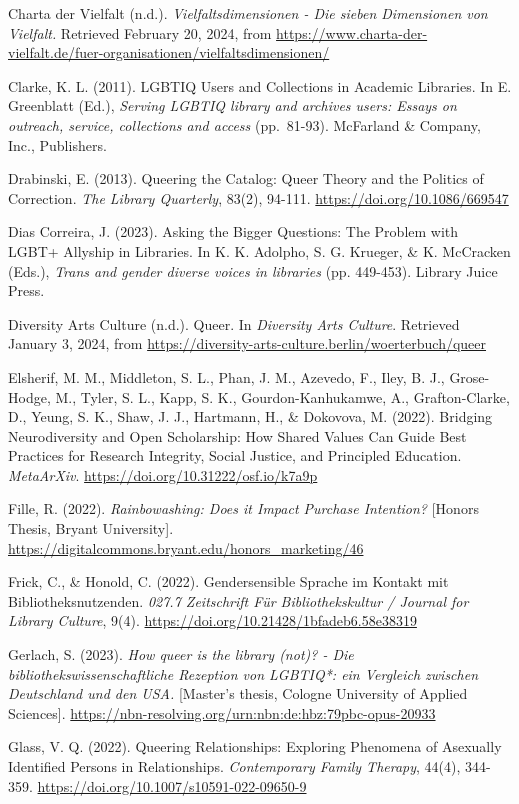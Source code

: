 \documentclass[a4paper,
fontsize=11pt,
oneside,
numbers=noperiodatend,
parskip=half-,
bibliography=totoc,
final
]{scrartcl}
\begin{document}
Charta der Vielfalt (n.d.). \emph{Vielfaltsdimensionen - Die sieben
Dimensionen von Vielfalt.} Retrieved February 20, 2024, from
\url{https://www.charta-der-vielfalt.de/fuer-organisationen/vielfaltsdimensionen/}

Clarke, K. L. (2011). LGBTIQ Users and Collections in Academic
Libraries. In E. Greenblatt (Ed.), \emph{Serving LGBTIQ library and
archives users: Essays on outreach, service, collections and access}
(pp.~81-93). McFarland \& Company, Inc., Publishers.

Drabinski, E. (2013). Queering the Catalog: Queer Theory and the
Politics of Correction. \emph{The Library Quarterly}, 83(2), 94-111.
\url{https://doi.org/10.1086/669547}

Dias Correira, J. (2023). Asking the Bigger Questions: The Problem with
LGBT+ Allyship in Libraries. In K. K. Adolpho, S. G. Krueger, \& K.
McCracken (Eds.), \emph{Trans and gender diverse voices in libraries}
(pp. 449-453). Library Juice Press.

Diversity Arts Culture (n.d.). Queer. In \emph{Diversity Arts Culture}.
Retrieved January 3, 2024, from
\url{https://diversity-arts-culture.berlin/woerterbuch/queer}

Elsherif, M. M., Middleton, S. L., Phan, J. M., Azevedo, F., Iley, B.
J., Grose-Hodge, M., Tyler, S. L., Kapp, S. K., Gourdon-Kanhukamwe, A.,
Grafton-Clarke, D., Yeung, S. K., Shaw, J. J., Hartmann, H., \&
Dokovova, M. (2022). Bridging Neurodiversity and Open Scholarship: How
Shared Values Can Guide Best Practices for Research Integrity, Social
Justice, and Principled Education. \emph{MetaArXiv}.
\url{https://doi.org/10.31222/osf.io/k7a9p}

Fille, R. (2022). \emph{Rainbowashing: Does it Impact Purchase
Intention?} {[}Honors Thesis, Bryant University{]}.
\url{https://digitalcommons.bryant.edu/honors_marketing/46}

Frick, C., \& Honold, C. (2022). Gendersensible Sprache im Kontakt mit
Bibliotheksnutzenden. \emph{027.7 Zeitschrift Für Bibliothekskultur /
Journal for Library Culture}, 9(4).
\url{https://doi.org/10.21428/1bfadeb6.58e38319}

Gerlach, S. (2023). \emph{How queer is the library (not)? - Die
bibliothekswissenschaftliche Rezeption von LGBTIQ*: ein Vergleich
zwischen Deutschland und den USA.} {[}Master's thesis,
Cologne University of Applied Sciences{]}.
\url{https://nbn-resolving.org/urn:nbn:de:hbz:79pbc-opus-20933}

Glass, V. Q. (2022). Queering Relationships: Exploring Phenomena of
Asexually Identified Persons in Relationships. \emph{Contemporary Family
Therapy}, 44(4), 344-359.
\url{https://doi.org/10.1007/s10591-022-09650-9}
\end{document}
